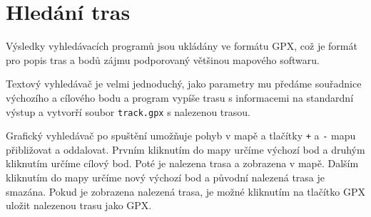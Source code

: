 \section*{Hledání tras}
Výsledky vyhledávacích programů jsou ukládány ve formátu GPX, což je formát pro
popis tras a bodů zájmu podporovaný většinou mapového softwaru. 

Textový vyhledávač je velmi jednoduchý, jako parametry mu předáme souřadnice
výchozího a cílového bodu a program vypíše trasu s informacemi na standardní
výstup a vytvorří soubor \verb|track.gpx| s nalezenou trasou.

Grafický vyhledávač po spuštění umožňuje pohyb v mapě a tlačítky \verb|+| a
\verb|-| mapu
přibližovat a oddalovat. Prvním kliknutím do mapy určíme výchozí bod a druhým
kliknutím určíme cílový bod. Poté je nalezena trasa a zobrazena v mapě. Dalším
kliknutím do mapy určíme nový výchozí bod a původní nalezená trasa je smazána.
Pokud je zobrazena nalezená trasa, je možné kliknutím na tlačítko GPX uložit
nalezenou trasu jako GPX.

